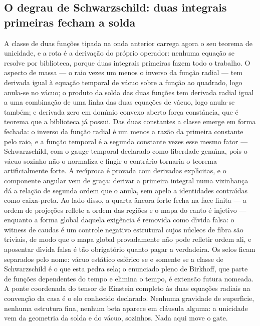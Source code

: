 \documentclass[11pt]{article}
\theoremstyle{definition}\newtheorem{deriv}{Derivação}
\begin{document}
\subsection*{O degrau de Schwarzschild: duas integrais primeiras fecham a solda}A classe de duas fun\c{c}\~oes tipada na onda anterior carrega agora o seu teorema de unicidade, e a rota \'e a deriva\c{c}\~ao do pr\'oprio operador: nenhuma equa\c{c}\~ao se resolve por biblioteca, porque duas integrais primeiras fazem todo o trabalho. O aspecto de massa --- o raio vezes um menos o inverso da fun\c{c}\~ao radial --- tem derivada igual \`a equa\c{c}\~ao temporal de v\'acuo sobre a fun\c{c}\~ao ao quadrado, logo anula-se no v\'acuo; o produto da solda das duas fun\c{c}\~oes tem derivada radial igual a uma combina\c{c}\~ao de uma linha das duas equa\c{c}\~oes de v\'acuo, logo anula-se tamb\'em; e derivada zero em dom\'\i{}nio convexo aberto for\c{c}a const\^ancia, que \'e teorema que a biblioteca j\'a possui. Das duas constantes a classe emerge em forma fechada: o inverso da fun\c{c}\~ao radial \'e um menos a raz\~ao da primeira constante pelo raio, e a fun\c{c}\~ao temporal \'e a segunda constante vezes esse mesmo fator --- Schwarzschild, com o gauge temporal declarado como liberdade genu\'\i{}na, pois o v\'acuo sozinho n\~ao o normaliza e fingir o contr\'ario tornaria o teorema artificialmente forte. A rec\'\i{}proca \'e provada com derivadas expl\'\i{}citas, e o componente angular vem de gra\c{c}a: derivar a primeira integral numa vizinhan\c{c}a d\'a a rela\c{c}\~ao de segunda ordem que o anula, sem apelo a identidades contra\'\i{}das como caixa-preta. Ao lado disso, a quarta \^ancora forte fecha na face finita --- a ordem de proje\c{c}\~oes reflete a ordem das regi\~oes e o mapa do canto \'e injetivo --- enquanto a forma global daquela exig\^encia \'e removida como d\'\i{}vida falsa: o witness de caudas \'e um controle negativo estrutural cujos n\'ucleos de fibra s\~ao triviais, de modo que o mapa global provadamente n\~ao pode refletir ordem ali, e aposentar d\'\i{}vida falsa \'e t\~ao obrigat\'orio quanto pagar a verdadeira. Os selos ficam separados pelo nome: v\'acuo est\'atico esf\'erico se e somente se a classe de Schwarzschild \'e o que esta pedra sela; o enunciado pleno de Birkhoff, que parte de fun\c{c}\~oes dependentes do tempo e elimina o tempo, \'e extens\~ao futura nomeada. A ponte coordenada do tensor de Einstein completo \`as duas equa\c{c}\~oes radiais na conven\c{c}\~ao da casa \'e o elo conhecido declarado. Nenhuma gravidade de superf\'\i{}cie, nenhuma estrutura fina, nenhum beta aparece em cl\'ausula alguma: a unicidade vem da geometria da solda e do v\'acuo, sozinhos. Nada aqui move o gate.
\end{document}
